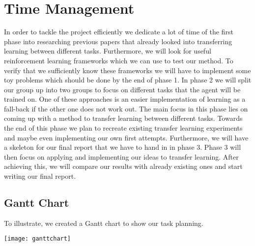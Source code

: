 \section{Time Management}
\label{sec:time}
In order to tackle the project efficiently we dedicate a lot of time of the first phase into researching previous papers that already looked into transferring learning between different tasks. Furthermore, we will look for useful reinforcement learning frameworks which we can use to test our method. To verify that we sufficiently know these frameworks we will have to implement some toy problems which should be done by the end of phase 1. 
In phase 2 we will split our group up into two groups to focus on different tasks that the agent will be trained on. One of these approaches is an easier implementation of learning as a fall-back if the other one does not work out. The main focus in this phase lies on coming up with a method to transfer learning between different tasks. Towards the end of this phase we plan to recreate existing transfer learning experiments and maybe even implementing our own first attempts. Furthermore, we will have a skeleton for our final report that we have to hand in in phase 3.
Phase 3 will then focus on applying and implementing our ideas to transfer learning. After achieving this, we will compare our results with already existing ones and start writing our final report.

\subsection{Gantt Chart}
To illustrate, we created a Gantt chart to show our task planning.

\noindent
\texttt{[image: ganttchart]}

